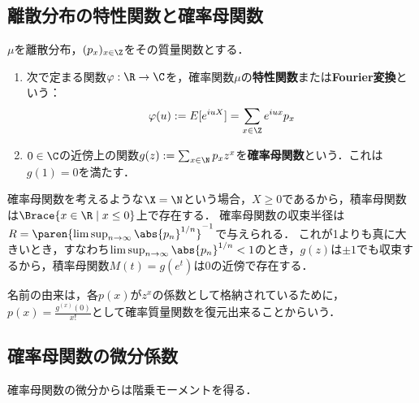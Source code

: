 \documentclass[uplatex,dvipdfmx]{jsreport}
\begin{document}
\subsection{離散分布の特性関数と確率母関数}

\begin{definition}
    $\mu$を離散分布，$(p_x)_{x\in\Z}$をその質量関数とする．
    \begin{enumerate}
        \item 次で定まる関数$\varphi:\R\to\C$を，確率関数$\mu$の\textbf{特性関数}または\textbf{Fourier変換}という：
        \[\varphi(u):=E[e^{iuX}]=\sum_{x\in\Z}e^{iux}p_x\]
        \item $0\in\C$の近傍上の関数$g(z):=\sum_{x\in\N}p_xz^x$を\textbf{確率母関数}という．これは$g(1)=0$を満たす．
    \end{enumerate}
\end{definition}
\begin{remark}[積率母関数の存在]
    確率母関数を考えるような$\X=\N$という場合，$X\ge0$であるから，積率母関数は$\Brace{x\in\R\mid x\le0}$上で存在する．
    確率母関数の収束半径は$R=\paren{\limsup_{n\to\infty}\abs{p_n}^{1/n}}^{-1}$で与えられる．
    これが1よりも真に大きいとき，すなわち$\limsup_{n\to\infty}\abs{p_n}^{1/n}<1$のとき，$g(z)$は$\pm1$でも収束するから，積率母関数$M(t)=g(e^t)$は$0$の近傍で存在する．
\end{remark}
\begin{remarks}[確率母関数の名前の由来]
    名前の由来は，各$p(x)$が$z^x$の係数として格納されているために，$p(x)=\frac{g^{(x)}(0)}{x!}$として確率質量関数を復元出来ることからいう．
\end{remarks}

\subsection{確率母関数の微分係数}

\begin{tcolorbox}[colframe=ForestGreen, colback=ForestGreen!10!white,breakable,colbacktitle=ForestGreen!40!white,coltitle=black,fonttitle=\bfseries\sffamily,
title=]
    確率母関数の微分からは階乗モーメントを得る．
\end{tcolorbox}
\end{document}
